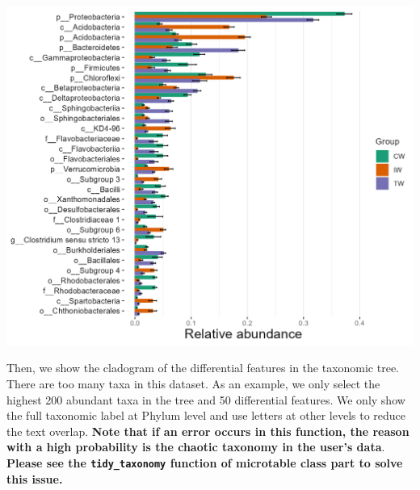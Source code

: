 \documentclass[
]{book}
\newenvironment{Shaded}{\begin{snugshade}}{\end{snugshade}}
\newcommand{\AttributeTok}[1]{\textcolor[rgb]{0.77,0.63,0.00}{#1}}
\newcommand{\CommentTok}[1]{\textcolor[rgb]{0.56,0.35,0.01}{\textit{#1}}}
\newcommand{\DecValTok}[1]{\textcolor[rgb]{0.00,0.00,0.81}{#1}}
\newcommand{\FunctionTok}[1]{\textcolor[rgb]{0.00,0.00,0.00}{#1}}
\newcommand{\NormalTok}[1]{#1}
\newcommand{\SpecialCharTok}[1]{\textcolor[rgb]{0.00,0.00,0.00}{#1}}
\newcommand{\StringTok}[1]{\textcolor[rgb]{0.31,0.60,0.02}{#1}}
\begin{document}
\begin{center}\includegraphics[width=650px]{Images/trans_diff_lefse_abund} \end{center}

Then, we show the cladogram of the differential features in the taxonomic tree.
There are too many taxa in this dataset.
As an example, we only select the highest 200 abundant taxa in the tree and 50 differential features.
We only show the full taxonomic label at Phylum level and use letters at other levels to reduce the text overlap.
\textbf{Note that if an error occurs in this function, the reason with a high probability is the chaotic taxonomy in the user's data}.
\textbf{Please see the \texttt{tidy\_taxonomy} function of microtable class part to solve this issue.}

\begin{Shaded}
\end{Shaded}
\end{document}
